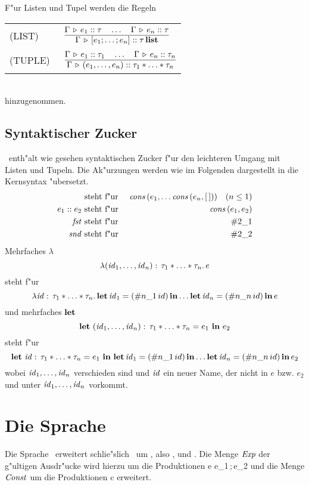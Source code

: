F"ur Listen und Tupel werden die Regeln\\[3mm]
\begin{tabular}{ll}
  \mbox{(LIST)\ } & $\regel{\Tj{\Gamma}{e_1}{\tau} \quad \ldots \quad \Tj{\Gamma}{e_n}{\tau}}
                           {\Tj{\Gamma}{[e_1;\ldots;e_n]}{\ltype{\tau}}}$ \\[5mm]
  \mbox{(TUPLE)\ }& $\regel{\Tj{\Gamma}{e_1}{\tau_1} \quad \ldots \quad \Tj{\Gamma}{e_n}{\tau_n}}
                           {\Tj{\Gamma}{(e_1,\ldots,e_n)}{\tau_1 * \ldots * \tau_n}}$
\end{tabular}\\[7mm]
hinzugenommen.


\subsection{Syntaktischer Zucker}

\LTHREE\ enth"alt wie gesehen syntaktischen Zucker f"ur den leichteren Umgang mit Listen und Tupeln. Die Ak"urzungen werden
wie im Folgenden dargestellt in die Kernsyntax "ubersetzt.
\begin{eqnarray*}
  [e_1;\ldots;e_n]    & \mbox{ steht f"ur } & \Cons\,(e_1,\ldots \Cons\,(e_n, [\,])) \quad (n \le 1) \\
  e_1 \coloncolon e_2 & \mbox{ steht f"ur } & \Cons\,(e_1, e_2) \\
  \Fst                & \mbox{ steht f"ur } & \#2\_1 \\
  \Snd                & \mbox{ steht f"ur } & \#2\_2
\end{eqnarray*}
Mehrfaches $\lambda$
\[
  \lambda({\text{\it id\/}}_1,\ldots,{\text{\it id\/}}_n):\,\tau_1 * \ldots * \tau_n.\,e
\]
steht f"ur
\[
  \lambda {\text{\it id\/}}:\,\tau_1 * \ldots * \tau_n.\,\textbf{let}\,{\text{\it id\/}}_1 = (\#n\_1\,id)\,\textbf{in} \ldots \textbf{let}\,{\text{\it id\/}}_n = (\#n\_n\,id)\,\textbf{in}\,e
\]
und mehrfaches $\textbf{let}$
\[
  \textbf{let}\ ({\text{\it id\/}}_1,\ldots,{\text{\it id\/}}_n):\,\tau_1 * \ldots * \tau_n = e_1\ \textbf{in}\ e_2
\]
steht f"ur
\[
  \textbf{let}\ {\text{\it id\/}}:\,\tau_1 * \ldots * \tau_n = e_1\ \textbf{in}\ \textbf{let}\,{\text{\it id\/}}_1 = (\#n\_1\,id)\,\textbf{in} \ldots \textbf{let}\,{\text{\it id\/}}_n = (\#n\_n\,id)\,\textbf{in}\,e_2
\]
wobei ${\text{\it id\/}}_1,\ldots,{\text{\it id\/}}_n$ verschieden sind und ${\text{\it id\/}}$ ein neuer Name, der nicht in $e$ bzw. $e_2$ und unter ${\text{\it id\/}}_1,\ldots,{\text{\it id\/}}_n$
vorkommt.



\section{Die Sprache \LFOUR}

Die Sprache \LFOUR\ erweitert schlie"slich \LTHREE\ um , also ,  und
. Die Menge ${\text{\it Exp\/}}$ der g"ultigen Ausdr"ucke wird hierzu um die Produktionen
\bgram
e \is {}
  \al {}
  \al e_1\,;\,e_2
\egram
und die Menge ${\text{\it Const\/}}$ um die Produktionen 
\bgram
c \is \Ref \mid \Deref \mid \Assign
\egram
erweitert.

